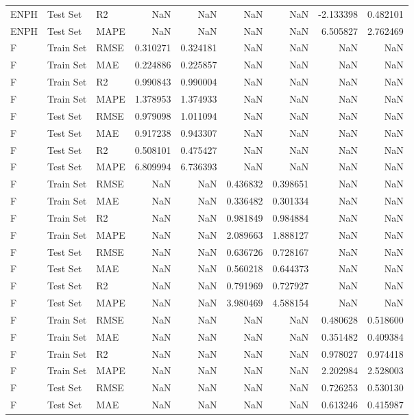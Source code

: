 \begin{tabular}{lllrrrrrr}
ENPH & Test Set & R2 & NaN & NaN & NaN & NaN & -2.133398 & 0.482101 \\
ENPH & Test Set & MAPE & NaN & NaN & NaN & NaN & 6.505827 & 2.762469 \\
F & Train Set & RMSE & 0.310271 & 0.324181 & NaN & NaN & NaN & NaN \\
F & Train Set & MAE & 0.224886 & 0.225857 & NaN & NaN & NaN & NaN \\
F & Train Set & R2 & 0.990843 & 0.990004 & NaN & NaN & NaN & NaN \\
F & Train Set & MAPE & 1.378953 & 1.374933 & NaN & NaN & NaN & NaN \\
F & Test Set & RMSE & 0.979098 & 1.011094 & NaN & NaN & NaN & NaN \\
F & Test Set & MAE & 0.917238 & 0.943307 & NaN & NaN & NaN & NaN \\
F & Test Set & R2 & 0.508101 & 0.475427 & NaN & NaN & NaN & NaN \\
F & Test Set & MAPE & 6.809994 & 6.736393 & NaN & NaN & NaN & NaN \\
F & Train Set & RMSE & NaN & NaN & 0.436832 & 0.398651 & NaN & NaN \\
F & Train Set & MAE & NaN & NaN & 0.336482 & 0.301334 & NaN & NaN \\
F & Train Set & R2 & NaN & NaN & 0.981849 & 0.984884 & NaN & NaN \\
F & Train Set & MAPE & NaN & NaN & 2.089663 & 1.888127 & NaN & NaN \\
F & Test Set & RMSE & NaN & NaN & 0.636726 & 0.728167 & NaN & NaN \\
F & Test Set & MAE & NaN & NaN & 0.560218 & 0.644373 & NaN & NaN \\
F & Test Set & R2 & NaN & NaN & 0.791969 & 0.727927 & NaN & NaN \\
F & Test Set & MAPE & NaN & NaN & 3.980469 & 4.588154 & NaN & NaN \\
F & Train Set & RMSE & NaN & NaN & NaN & NaN & 0.480628 & 0.518600 \\
F & Train Set & MAE & NaN & NaN & NaN & NaN & 0.351482 & 0.409384 \\
F & Train Set & R2 & NaN & NaN & NaN & NaN & 0.978027 & 0.974418 \\
F & Train Set & MAPE & NaN & NaN & NaN & NaN & 2.202984 & 2.528003 \\
F & Test Set & RMSE & NaN & NaN & NaN & NaN & 0.726253 & 0.530130 \\
F & Test Set & MAE & NaN & NaN & NaN & NaN & 0.613246 & 0.415987 \\

\end{tabular}
